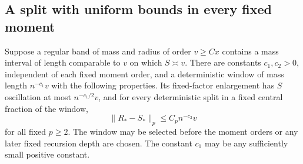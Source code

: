 \subsection{A split with uniform bounds in every fixed moment}

\begin{lemma}\label{comp:good-split}
Suppose a regular band of mass and radius of order $v\ge Cx$ contains
a mass interval of length comparable to $v$ on which $S\asymp v$.
There are constants $c_1,c_2>0$, independent of each fixed moment order,
and a deterministic window of mass length $n^{-c_1}v$ with the following
properties.  Its fixed-factor enlargement has $S$ oscillation at most
$n^{-c_1/2}v$, and for every deterministic split in a fixed central
fraction of the window,
\begin{equation}
 \|R_*-S_*\|_p\le C_p n^{-c_2}v
 \tag{17}\label{eq:17}
\end{equation}
for all fixed $p\ge2$.  The window may be selected before the moment
orders or any later fixed recursion depth are chosen.  The constant
$c_1$ may be any sufficiently small positive constant.
\end{lemma}

